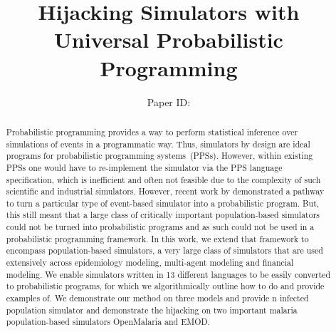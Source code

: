 \documentclass{article}
\title{Hijacking Simulators with Universal Probabilistic Programming}
\author{%
Paper ID: }
\begin{document}

\maketitle

\begin{abstract}


Probabilistic programming provides a way to perform statistical inference over simulations of events in a programmatic way. Thus, simulators by design are ideal programs for probabilistic programming systems~(PPSs).
However, within existing PPSs one would have to re-implement the simulator via the PPS language specification, which is inefficient and often not feasible due to the complexity of such scientific and industrial simulators.
However, recent work
by \cite{baydin2018efficient} demonstrated a pathway to turn a particular
type of event-based simulator into a probabilistic program. 
 But, this still meant that a large class of critically important population-based simulators could not be turned into probabilistic programs and as such could not be used in a probabilistic programming framework.
In this work, we extend that framework to encompass population-based simulators, a very large class of simulators that are used extensively across epidemiology modeling, multi-agent modeling and financial modeling. We enable simulators written in 13 different languages to be easily converted to probabilistic programs, for which we algorithmically outline how to do and provide examples of. We demonstrate our method on three models and provide n infected population simulator and demonstrate the hijacking on two important malaria population-based simulators OpenMalaria and EMOD. 


\end{abstract}
\end{document}
